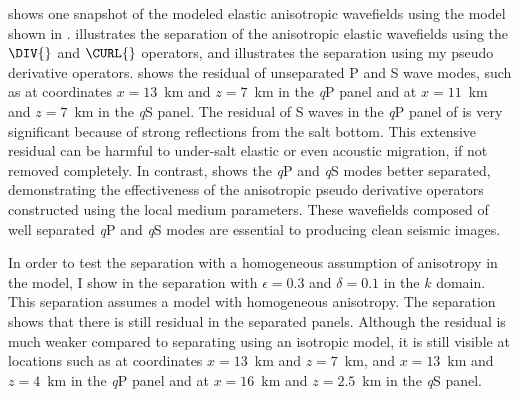 
 shows one snapshot of the modeled elastic anisotropic 
wavefields using the model shown in . 
 illustrates the separation of the anisotropic elastic
 wavefields using the $\DIV{}$ and $\CURL{}$ operators, and 
 illustrates the separation using my pseudo 
derivative operators.   shows the residual of
unseparated P and S wave modes, such as at coordinates $x=13$~km and
$z=7$~km in the {\it q}P panel and at $x=11$~km and $z=7$~km in the
{\it q}S panel.  The residual of S waves in the {\it q}P panel
of  is very significant because of strong
reflections from the salt bottom.  This extensive residual can be
harmful to under-salt elastic or even acoustic migration, if not
removed completely.  In contrast,  shows the
{\it q}P and {\it q}S modes {better} separated,
demonstrating the effectiveness of the anisotropic pseudo derivative
operators constructed using the local medium parameters.  These
wavefields composed of well separated {\it q}P and {\it q}S modes are
essential to producing clean seismic images.

{In order to test the separation with a homogeneous assumption of 
anisotropy in the model, I show in}  the
separation with $\epsilon=0.3$ and $\delta=0.1$ in the $k$
domain. This separation assumes a model with homogeneous
anisotropy. The separation shows that there is still residual in the
separated panels. Although the residual is much weaker compared to
separating using an isotropic model, it is still visible at locations
such as at coordinates $x=13$~km and $z=7$~km, and $x=13$~km and
$z=4$~km in the {\it q}P panel and at $x=16$~km and $z=2.5$~km in the
{\it q}S panel.


